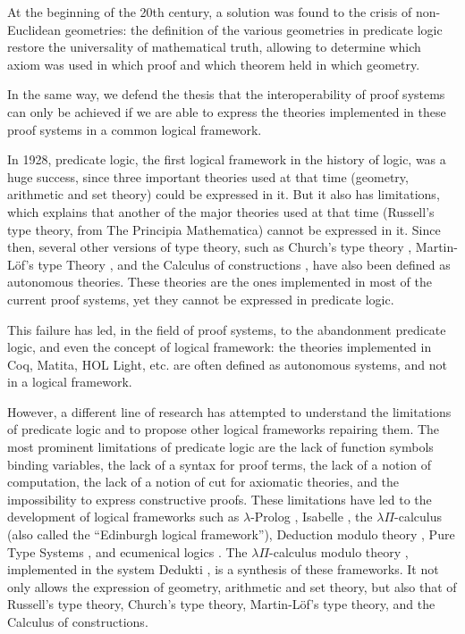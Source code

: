 At the beginning of the 20th century, a solution was found to the
crisis of non-Euclidean geometries: the definition of the various
geometries in predicate logic \cite{HilbertAckermann} restore the
universality of mathematical truth, allowing to determine which axiom
was used in which proof and which theorem held in which geometry.

In the same way, we defend the thesis that the interoperability of
proof systems can only be achieved if we are able to express the
theories implemented in these proof systems in a common logical
framework.

In 1928, predicate logic, the first logical framework in the history
of logic, was a huge success, since three important theories used at
that time (geometry, arithmetic and set theory) could be expressed in
it. But it also has limitations, which explains that another of the
major theories used at that time (Russell's type theory, from The
Principia Mathematica) cannot be expressed in it. Since then, several
other versions of type theory, such as Church's type theory
\cite{Church40}, Martin-L\"of's type Theory \cite{Martin-Lof84}, and
the Calculus of constructions \cite{CoquandHuet88}, have also been
defined as autonomous theories. These theories are the ones
implemented in most of the current proof systems, yet they cannot be
expressed in predicate logic.

This failure has led, in the field of proof systems, to the
abandonment predicate logic, and even the concept of logical
framework: the theories implemented in {\sc Coq}, {\sc Matita}, {\sc
  HOL Light}, etc. are often defined as autonomous systems, and not in
a logical framework.

However, a different line of research has attempted to understand the
limitations of predicate logic and to propose other logical frameworks
repairing them. The most prominent limitations of predicate logic are
the lack of function symbols binding variables, the lack of a syntax
for proof terms, the lack of a notion of computation, the lack of a
notion of cut for axiomatic theories, and the impossibility to express
constructive proofs. These limitations have led to the development of
logical frameworks such as $\lambda$-Prolog \cite{NadathurMiller88,
  MillerNadathur12}, Isabelle \cite{Paulson90}, the $\lambda
\Pi$-calculus \cite{HarperHonsellPlotkin91} (also called the
``Edinburgh logical framework''), Deduction modulo theory
\cite{DowekHardinKirchner03, DowekWerner03}, Pure Type Systems
\cite{Berardi88,Terlouw89}, and ecumenical logics
\cite{Prawitz15,Dowek15,PereiraRodriguez17}. The $\lambda
\Pi$-calculus modulo theory \cite{CousineauDowek07}, implemented in
the system {\sc Dedukti} \cite{Assaf16}, is a synthesis of these
frameworks. It not only allows the expression of geometry, arithmetic
and set theory, but also that of Russell's type theory, Church's type
theory, Martin-L\"of's type theory, and the Calculus of constructions.


